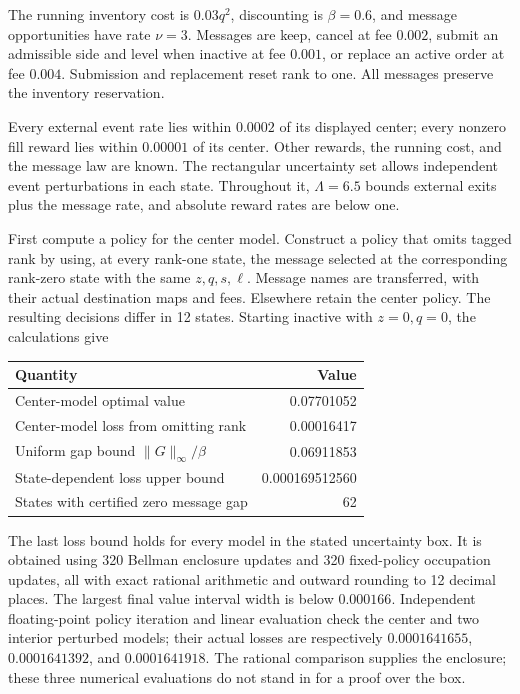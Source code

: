 \documentclass[11pt]{article}
\theoremstyle{plain}
\theoremstyle{definition}
\theoremstyle{remark}
\begin{document}
The running inventory cost is \(0.03q^2\), discounting is
\(\beta=0.6\), and message opportunities have rate \(\nu=3\).
Messages are keep, cancel at fee \(0.002\), submit an admissible
side and level when inactive at fee \(0.001\), or replace an active
order at fee \(0.004\). Submission and replacement reset rank to
one. All messages preserve the inventory reservation.

Every external event rate lies within \(0.0002\) of its displayed
center; every nonzero fill reward lies within \(0.00001\) of its
center. Other rewards, the running cost, and the message law are
known. The rectangular uncertainty set allows independent event
perturbations in each state. Throughout it, \(\Lambda=6.5\) bounds
external exits plus the message rate, and absolute reward rates
are below one.

First compute a policy for the center model. Construct a policy
that omits tagged rank by using, at every rank-one state, the
message selected at the corresponding rank-zero state with the
same \(z,q,s,\ell\). Message names are transferred, with their
actual destination maps and fees. Elsewhere retain the center
policy. The resulting decisions differ in 12 states.
Starting inactive with \(z=0,q=0\), the calculations give
\begin{center}
\begin{tabular}{@{}lr@{}}
\toprule
Quantity&Value\\
\midrule
Center-model optimal value&0.07701052\\
Center-model loss from omitting rank&0.00016417\\
Uniform gap bound \(\|G\|_\infty/\beta\)&0.06911853\\
State-dependent loss upper bound&0.000169512560\\
States with certified zero message gap&62\\
\bottomrule
\end{tabular}
\end{center}
The last loss bound holds for every model in the stated uncertainty
box. It is obtained using 320 Bellman enclosure updates and 320
fixed-policy occupation updates, all with exact rational arithmetic
and outward rounding to 12 decimal places. The largest final value
interval width is below \(0.000166\).
Independent floating-point policy iteration and linear evaluation
check the center and two interior perturbed models; their actual
losses are respectively \(0.0001641655\), \(0.0001641392\), and
\(0.0001641918\). The rational comparison supplies the enclosure;
these three numerical evaluations do not stand in for a proof
over the box.
\end{document}
